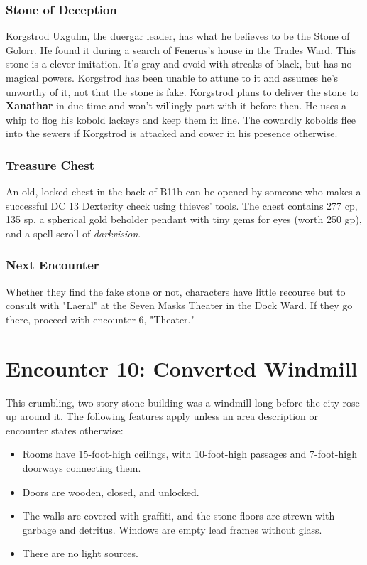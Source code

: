 \documentclass[10pt,a4paper,twoside,twocolumn,openany,nodeprecatedcode]{dndbook}
\begin{document}
\subsubsection{Stone of Deception}
Korgstrod Uxgulm, the duergar leader, has what he believes to be the Stone of Golorr. He found it during a search of Fenerus's house in the Trades Ward. This stone is a clever imitation. It's gray and ovoid with streaks of black, but has no magical powers. Korgstrod has been unable to attune to it and assumes he's unworthy of it, not that the stone is fake.
Korgstrod plans to deliver the stone to \textbf{Xanathar} in due time and won't willingly part with it before then. He uses a whip to flog his kobold lackeys and keep them in line. The cowardly kobolds flee into the sewers if Korgstrod is attacked and cower in his presence otherwise.
\subsubsection{Treasure Chest}
An old, locked chest in the back of B11b can be opened by someone who makes a successful DC 13 Dexterity check using thieves' tools. The chest contains 277 cp, 135 sp, a spherical gold beholder pendant with tiny gems for eyes (worth 250 gp), and a spell scroll of \textit{darkvision}.
\subsubsection{Next Encounter}
Whether they find the fake stone or not, characters have little recourse but to consult with "Laeral" at the Seven Masks Theater in the Dock Ward. If they go there, proceed with encounter 6, "Theater."
\section{Encounter 10: Converted Windmill}
This crumbling, two-story stone building was a windmill long before the city rose up around it. The following features apply unless an area description or encounter states otherwise:
\begin{itemize}

\item Rooms have 15-foot-high ceilings, with 10-foot-high passages and 7-foot-high doorways connecting them.
\item Doors are wooden, closed, and unlocked.
\item The walls are covered with graffiti, and the stone floors are strewn with garbage and detritus. Windows are empty lead frames without glass.
\item There are no light sources.
\end{itemize}
\end{document}
